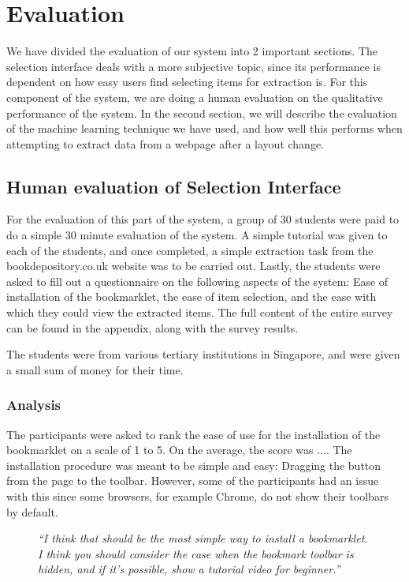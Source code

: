\chapter{Evaluation}
\label{chap:evaluation}
We have divided the evaluation of our system into 2 important sections. The selection interface
deals with a more subjective topic, since its performance is dependent on how easy users find 
selecting items for extraction is. For this component of the system, we are doing a human
evaluation on the qualitative performance of the system. In the second section, we will describe
the evaluation of the machine learning technique we have used, and how well this performs when
attempting to extract data from a webpage after a layout change.



\section{Human evaluation of Selection Interface}

For the evaluation of this part of the system, a group of 30 students were paid to do a simple 30
minute evaluation of the system. A simple tutorial was given to each of the students, and once
completed, a simple extraction task from the bookdepository.co.uk website was to be carried out.
Lastly, the students were asked to fill out a questionnaire on the following aspects of the
system: Ease of installation of the bookmarklet, the ease of item selection, and the ease with
which they could view the extracted items. The full content of the entire survey can be found in
the appendix, along with the survey results.

The students were from various tertiary institutions in Singapore, and were given a small sum of
money for their time.



\subsection{Analysis}
The participants were asked to rank the ease of use for the installation of the bookmarklet on
a scale of 1 to 5. On the average, the score was .... The installation procedure was meant to
be simple and easy: Dragging the button from the page to the toolbar. However, some of the 
participants had an issue with this since some browsers, for example Chrome, do not show their
toolbars by default.

\begin{figure}
\textit{
``I think that should be the most simple way to install a bookmarklet. 
I think you should consider the case when the bookmark toolbar is hidden,
and if it's possible, show a tutorial video for beginner.''}
\end{figure}

